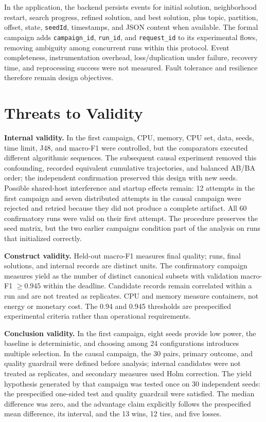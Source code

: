 In the application, the backend persists events for initial solution, neighborhood restart, search progress, refined solution, and best solution, plus topic, partition, offset, state, \texttt{seedId}, timestamps, and JSON content when available. The formal campaign adds \texttt{campaign\_id}, \texttt{run\_id}, and \texttt{request\_id} to its experimental flows, removing ambiguity among concurrent runs within this protocol. Event completeness, instrumentation overhead, loss/duplication under failure, recovery time, and reprocessing success were not measured. Fault tolerance and resilience therefore remain design objectives.

\section{Threats to Validity}

\textbf{Internal validity.} In the first campaign, CPU, memory, CPU set, data, seeds, time limit, J48, and macro-F1 were controlled, but the comparators executed different algorithmic sequences. The subsequent causal experiment removed this confounding, recorded equivalent cumulative trajectories, and balanced AB/BA order; the independent confirmation preserved this design with new seeds. Possible shared-host interference and startup effects remain: 12 attempts in the first campaign and seven distributed attempts in the causal campaign were rejected and retried because they did not produce a complete artifact. All 60 confirmatory runs were valid on their first attempt. The procedure preserves the seed matrix, but the two earlier campaigns condition part of the analysis on runs that initialized correctly.

\textbf{Construct validity.} Held-out macro-F1 measures final quality; runs, final solutions, and internal records are distinct units. The confirmatory campaign measures yield as the number of distinct canonical subsets with validation macro-F1 $\geq 0.945$ within the deadline. Candidate records remain correlated within a run and are not treated as replicates. CPU and memory measure containers, not energy or monetary cost. The 0.94 and 0.945 thresholds are prespecified experimental criteria rather than operational requirements.

\textbf{Conclusion validity.} In the first campaign, eight seeds provide low power, the baseline is deterministic, and choosing among 24 configurations introduces multiple selection. In the causal campaign, the 30 pairs, primary outcome, and quality guardrail were defined before analysis; internal candidates were not treated as replicates, and secondary measures used Holm correction. The yield hypothesis generated by that campaign was tested once on 30 independent seeds: the prespecified one-sided test and quality guardrail were satisfied. The median difference was zero, and the advantage claim explicitly follows the prespecified mean difference, its interval, and the 13 wins, 12 ties, and five losses.

